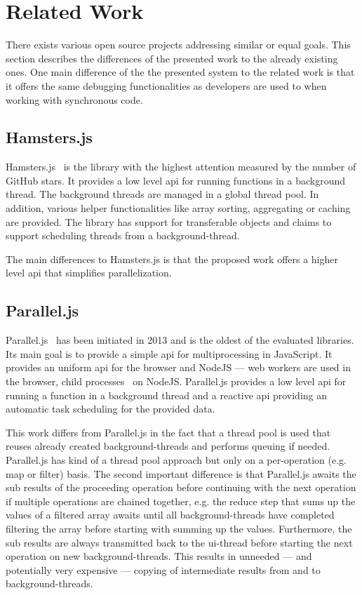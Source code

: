 \section{Related Work}\label{sec:related-work}
There exists various open source projects addressing similar or equal goals. This section describes the differences of the presented work to the already existing ones. One main difference of the the presented system to the related work is that it offers the same debugging functionalities as developers are used to when working with synchronous code.

\subsection{Hamsters.js}
Hamsters.js~\cite{hamstersjs} is the library with the highest attention measured by the number of GitHub stars. It provides a low level api for running functions in a background thread. The background threads are managed in a global thread pool. In addition, various helper functionalities like array sorting, aggregating or caching are provided. The library has support for transferable objects and claims to support scheduling threads from a background-thread. 

The main differences to Hamsters.js is that the proposed work offers a higher level api that simplifies parallelization. 

\subsection{Parallel.js}
Parallel.js~\cite{SavitzkyMayr2016} has been initiated in 2013 and is the oldest of the evaluated libraries. Its main goal is to provide a simple api for multiprocessing in JavaScript. It provides an uniform api for the browser and NodeJS --- web workers are used in the browser, child processes~\cite{childProcess} on NodeJS. Parallel.js provides a low level api for running a function in a background thread and a reactive api providing an automatic task scheduling for the provided data. 

This work differs from Parallel.js in the fact that a thread pool is used that reuses already created background-threads and performs queuing if needed. Parallel.js has kind of a thread pool approach but only on a per-operation (e.g. map or filter) basis. The second important difference is that Parallel.js awaits the sub results of the proceeding operation before continuing with the next operation if multiple operations are chained together, e.g. the reduce step that sums up the values of a filtered array awaits until all background-threads have completed filtering the array before starting with summing up the values. Furthermore, the sub results are always transmitted back to the ui-thread before starting the next operation on new background-threads. This results in unneeded --- and potentially very expensive --- copying of intermediate results from and to background-threads.


